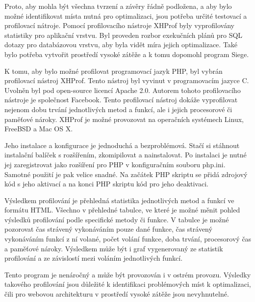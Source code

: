 \documentclass[12pt]{article}
\begin{document}
\obrazek
{}

Proto, aby mohla být všechna tvrzení a závěry řádně podložena, a aby bylo možné identifikovat místa nutná pro optimalizaci, jsou potřeba určité testovací a profilovací nátroje. Pomocí profilovacího nástroje XHProf byly vyprofilovány statistiky pro aplikační vrstvu. Byl proveden rozbor exekučních plánů pro SQL dotazy pro databázovou vrstvu, aby byla vidět míra jejich optimalizace. Také bylo potřeba vytvořit prostředí vysoké zátěže a k tomu dopomohl program Siege.

K tomu, aby bylo možné profilovat programovací jazyk PHP, byl vybrán profilovací nástroj XHProf. Tento nástroj byl vyvinut v programovacím jazyce C. Uvolněn byl pod open-source licencí Apache 2.0. Autorem tohoto profilovacího nástroje je společnost Facebook. Tento profilovací nástroj dokáže vyprofilovat nejenom dobu trvání jednotlivých metod a funkcí, ale i jejich procesorové či paměťové nároky. XHProf je možné provozovat na operačních systémech Linux, FreeBSD a Mac OS X.

Jeho instalace a konfigurace je jednoduchá a bezproblémová. Stačí si stáhnout instalační balíček s rozšířením, zkomipilovat a nainstalovat. Po instalaci je nutné jej zaregistrovat jako rozšíření pro PHP v konfiguračním souboru php.ini. Samotné použití je pak velice snadné. Na začátek PHP skriptu se přidá zdrojový kód s jeho aktivací a na konci PHP skriptu kód pro jeho deaktivaci.

Výsledkem profilování je přehledná statistika jednotlivých metod a funkcí ve formátu HTML. Všechno v přehledné tabulce, ve které je možné měnit pohled výsledků profilování podle specifické metody či funkce. V tabulce je možné pozorovat čas strávený vykonáváním pouze dané funkce, čas strávený vykonáváním funkcí z ní volané, počet volání funkce, doba trvání, procesorový čas a paměťové nároky. Výsledkem může být i graf vygenerovaný ze statistik profilování a ze závislostí mezi voláním jednotlivých funkcí.

Tento program je nenáročný a může být provozován i v ostrém provozu. Výsledky takového profilování jsou důležité k identifikaci problémových míst k optimalizaci, čili pro webovou architekturu v prostředí vysoké zátěže jsou nevyhnutelné.\cite{xhprof}
\end{document}
